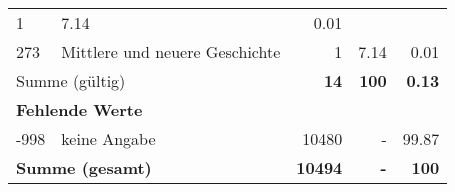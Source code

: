 \begin{longtable}{lXrrr}
       \num{1} &
       \num[round-mode=places,round-precision=2]{7,14} &
         \num[round-mode=places,round-precision=2]{0,01} \\

     273 &
     \multicolumn{1}{X}{ Mittlere und neuere Geschichte   } &


       \num{1} &
       \num[round-mode=places,round-precision=2]{7,14} &
         \num[round-mode=places,round-precision=2]{0,01} \\
     \midrule
     \multicolumn{2}{l}{Summe (gültig)} &
       \textbf{\num{14}} &
     \textbf{100} &
       \textbf{\num[round-mode=places,round-precision=2]{0,13}} \\
     \multicolumn{5}{l}{\textbf{Fehlende Werte}}\\
       -998 &
       keine Angabe &
         \num{10480} &
        - &
         \num[round-mode=places,round-precision=2]{99,87} \\
     \midrule
     \multicolumn{2}{l}{\textbf{Summe (gesamt)}} &
          \textbf{\num{10494}} &
        \textbf{-} &
        \textbf{100} \\
     \bottomrule
     \end{longtable}
     
